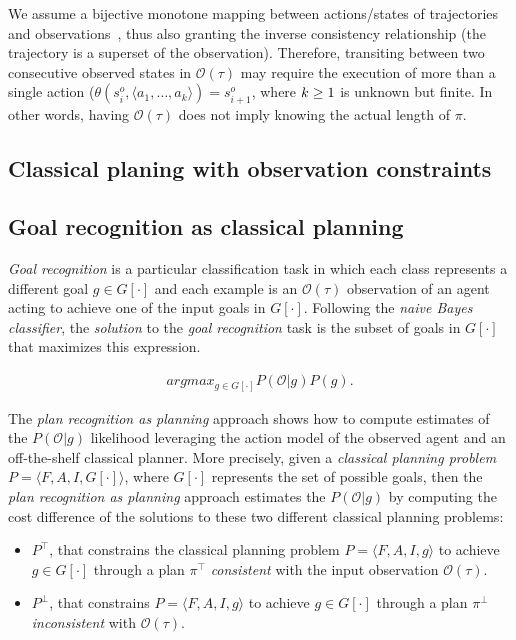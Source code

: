 \documentclass{article}
\newcommand{\tup}[1]{{\langle #1 \rangle}}
\begin{document}
We assume a bijective monotone mapping between actions/states of trajectories and observations~\cite{ramirez2009plan}, thus also granting the inverse consistency relationship (the trajectory is a superset of the observation). Therefore, transiting between two consecutive observed states in $\mathcal{O}(\tau)$ may require the execution of more than a single action ($\theta(s_i^o,\tup{a_1,\ldots,a_k})=s_{i+1}^o$, where ${\small k\geq 1}$ is unknown but finite. In other words, having $\mathcal{O}(\tau)$ does not imply knowing the actual length of $\pi$.

\subsection{Classical planing with observation constraints}

\subsection{Goal recognition as classical planning}
{\em Goal recognition} is a particular classification task in which each class represents a different goal $g\in G[\cdot]$ and each example is an $\mathcal{O}(\tau)$ observation of an agent acting to achieve one of the input goals in $G[\cdot]$. Following the {\em naive Bayes classifier}, the {\em solution} to the {\em goal recognition} task is the subset of goals in $G[\cdot]$ that maximizes this expression.

\begin{align}
argmax_{g\in G[\cdot]} P(\mathcal{O}|g) P(g).
\end{align}

The {\em plan recognition as planning} approach shows how to compute estimates of the $P(\mathcal{O}|g)$ likelihood leveraging the action model of the observed agent and an off-the-shelf classical planner. More precisely, given a {\em classical planning problem} $P=\tup{F,A,I,G[\cdot]}$, where $G[\cdot]$ represents the set of possible goals, then the {\em plan recognition as planning} approach estimates the $P(\mathcal{O}|g)$ by computing the cost difference of the solutions to these two different classical planning problems:
\begin{itemize}
\item $P^{\top}$, that constrains the classical planning problem $P=\tup{F,A,I,g}$ to achieve $g\in G[\cdot]$ through a plan $\pi^\top$ {\em consistent} with the input observation $\mathcal{O}(\tau)$.
\item $P^{\bot}$, that constrains $P=\tup{F,A,I,g}$ to achieve $g\in G[\cdot]$ through a plan $\pi^\bot$ {\em inconsistent} with $\mathcal{O}(\tau)$.
\end{itemize}
\end{document}
